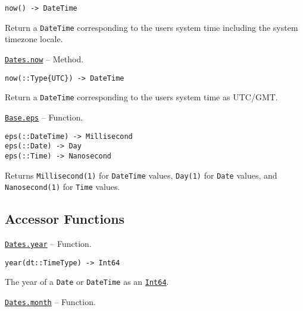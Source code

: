 \begin{adjustwidth}{2em}{0pt}


\begin{verbatim}
now() -> DateTime
\end{verbatim}

Return a \texttt{DateTime} corresponding to the user{\textquotesingle}s system time including the system timezone locale.



\end{adjustwidth}
\hypertarget{14867142023322691223}{} 
\hyperlink{14867142023322691223}{\texttt{Dates.now}}  -- {Method.}

\begin{adjustwidth}{2em}{0pt}


\begin{verbatim}
now(::Type{UTC}) -> DateTime
\end{verbatim}

Return a \texttt{DateTime} corresponding to the user{\textquotesingle}s system time as UTC/GMT.



\end{adjustwidth}
\hypertarget{4594213520310841636}{} 
\hyperlink{4594213520310841636}{\texttt{Base.eps}}  -- {Function.}

\begin{adjustwidth}{2em}{0pt}


\begin{verbatim}
eps(::DateTime) -> Millisecond
eps(::Date) -> Day
eps(::Time) -> Nanosecond
\end{verbatim}

Returns \texttt{Millisecond(1)} for \texttt{DateTime} values, \texttt{Day(1)} for \texttt{Date} values, and \texttt{Nanosecond(1)} for \texttt{Time} values.



\end{adjustwidth}

\hypertarget{15274886386548419130}{}


\subsection{Accessor Functions}


\hypertarget{9714527822092754339}{} 
\hyperlink{9714527822092754339}{\texttt{Dates.year}}  -- {Function.}

\begin{adjustwidth}{2em}{0pt}


\begin{verbatim}
year(dt::TimeType) -> Int64
\end{verbatim}

The year of a \texttt{Date} or \texttt{DateTime} as an \hyperlink{7720564657383125058}{\texttt{Int64}}.



\end{adjustwidth}
\hypertarget{3646624885120036576}{} 
\hyperlink{3646624885120036576}{\texttt{Dates.month}}  -- {Function.}

